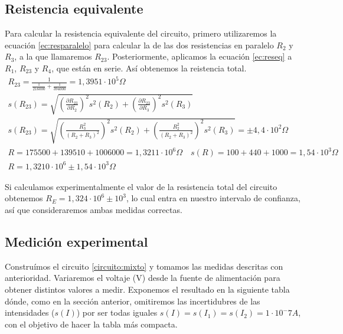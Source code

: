 \documentclass[12pt, a4paper, titlepage]{article}
\begin{document}
  \subsection{Reistencia equivalente}
  \label{sec:reseqmixto}

  Para calcular la resistencia equivalente del circuito, primero utilizaremos la ecuación \ref{ec:resparalelo} para calcular la de las dos resistencias en paralelo $R_2$ y $R_3$, a la que llamaremos $R_{23}$. Posteriormente, aplicamos la ecuación \ref{ec:reseq} a $R_1$, $R_{23}$ y $R_4$, que están en serie. Así obtenemos la reistencia total.
  \begin{gather}
    R_{23} = \frac{1}{\frac{1}{216000} + \frac{1}{394000}} = 1,3951\cdot10^5\Omega \nonumber \\
    s(R_{23}) = \sqrt{\left ( \frac{\partial R_{23}}{\partial R_2} \right )^2 s^2(R_2) + \left ( \frac{\partial R_{23}}{\partial R_3} \right )^2 s^2(R_3)} \nonumber \\
    s(R_{23}) = \sqrt{\left ( \frac{R_3^2}{(R_2+R_3)^2} \right )^2 s^2(R_2) + \left ( \frac{R_2^2}{(R_2+R_3)^2} \right )^2 s^2(R_3)} = \pm 4,4\cdot 10^2\Omega \nonumber \\
    R = 175500 + 139510 + 1006000 = 1,3211\cdot10^6\Omega \nonumber \quad s(R) = 100 + 440 + 1000 = 1,54\cdot 10^3\Omega \nonumber \\
    R = 1,3210\cdot10^6 \pm 1,54\cdot 10^3\Omega
  \end{gather}

  Si calculamos experimentalmente el valor de la resistencia total del circuito obtenemos $R_E = 1,324 \cdot 10^6 \pm 10^3$, lo cual entra en nuestro intervalo de confianza, así que consideraremos ambas medidas correctas.

  \subsection{Medición experimental}

  Construímos el circuito \ref{circuito:mixto} y tomamos las medidas descritas con anterioridad. Variaremos el voltaje (V) desde la fuente de alimentación para obtener distintos valores a medir. Exponemos el resultado en la siguiente tabla dónde, como en la sección anterior, omitiremos las incertidubres de las intensidades ($s(I)$) por ser todas iguales $s(I) = s(I_1) = s(I_2) = 1 \cdot 10^-7 A$, con el objetivo de hacer la tabla más compacta.
\end{document}
